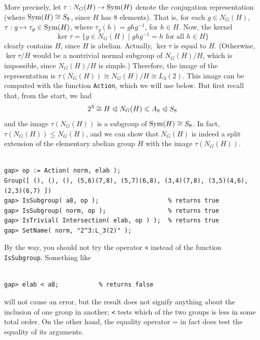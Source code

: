 More precisely, let $\tau : N_G(H) \rightarrow \operatorname{Sym}(H)$ denote the conjugation
representation (where $\operatorname{Sym}(H)\cong S_8$, since $H$ has 8 elements).  
That is, for each $g\in N_G(H)$, $\tau: g \mapsto \tau_g\in \operatorname{Sym}(H)$,
where $\tau_g(h) = gh g^{-1}$, for $h\in H$.  Now, the kernel
\[
\ker \tau = \{ g\in N_G(H) \mid  gh g^{-1} = h \text{ for all } h\in H\}
\]
clearly contains $H$, since $H$ is abelian.  
Actually, $\ker \tau$ is equal to $H$.  (Otherwise, $\ker \tau / H$ would
be a nontrivial normal subgroup of $N_G(H)/H$, which is impossible, since $N_G(H)/H$
is simple.)
Therefore, the image of the representation is $\tau(N_G(H)) \cong N_G(H)/H \cong L_3(2)$.  
This image can be computed with the function {\tt Action}, which we will use below.
But first recall that, from the start, we had 
\[
2^3 \cong H \trianglelefteqslant N_G(H) \leqslant A_8 \trianglelefteqslant S_8
\]
and the image $\tau(N_G(H))$ is a subgroup of $\operatorname{Sym}(H) \cong S_8$.  In fact, $\tau(N_G(H)) \leq
N_G(H)$, and we can show that $N_G(H)$ is indeed a split extension of the elementary
abelian group $H$ with the image $\tau(N_G(H))$. 
{\codesize
\begin{verbatim}

gap> op := Action( norm, elab );
Group([ (), (), (), (5,6)(7,8), (5,7)(6,8), (3,4)(7,8), (3,5)(4,6), (2,3)(6,7) ])
gap> IsSubgroup( a8, op );                   % returns true
gap> IsSubgroup( norm, op );                 % returns true
gap> IsTrivial( Intersection( elab, op ) );  % returns true
gap> SetName( norm, "2^3:L_3(2)" );

\end{verbatim}}
\noindent By the way, you should not try the operator \verb.<. instead of the function {\tt IsSubgroup}. Something like
{\codesize
\begin{verbatim}

gap> elab < a8;           % returns false

\end{verbatim}}
\noindent will not cause an error, but the result does not signify anything about the inclusion of one group in another;
\verb.<. tests which of the two groups is less in some total order. On the other hand, the equality operator = in
fact does test the equality of its arguments.

